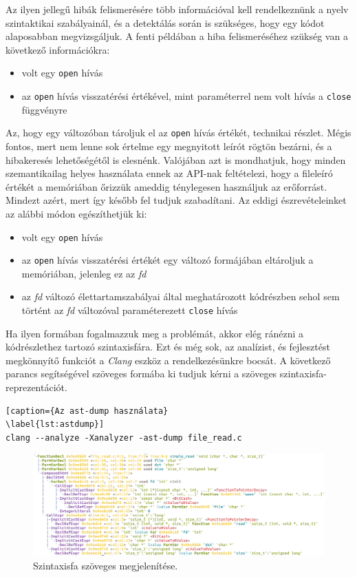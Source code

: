 \documentclass[a4paper,12pt]{report}
\begin{document}
Az ilyen jellegű hibák felismerésére több információval kell rendelkeznünk a nyelv szintaktikai szabályainál, és a detektálás során is szükséges, hogy egy kódot alaposabban megvizsgáljuk. A fenti példában a hiba felismeréséhez szükség van a következő információkra:
\begin{itemize}
\item volt egy \texttt{open} hívás
\item az \texttt{open} hívás visszatérési értékével, mint paraméterrel nem volt hívás a \texttt{close} függvényre
\end{itemize}
Az, hogy egy változóban tároljuk el az \texttt{open} hívás értékét, technikai részlet. Mégis fontos, mert nem lenne sok értelme egy megnyitott leírót rögtön bezárni, és a hibakeresés lehetőségétől is elesnénk.
Valójában azt is mondhatjuk, hogy minden szemantikailag helyes használata ennek az API-nak feltételezi, hogy a fileleíró értékét a memóriában őrizzük ameddig ténylegesen használjuk az erőforrást. Mindezt azért, mert így később fel tudjuk szabadítani. Az eddigi észrevételeinket az alábbi módon egészíthetjük ki:
\begin{itemize}
\item volt egy \texttt{open} hívás
\item az \texttt{open} hívás visszatérési értékét egy változó formájában eltároljuk a memóriában, jelenleg ez az \emph{fd}
\item az \emph{fd} változó élettartamszabályai által meghatározott kódrészben sehol sem történt az \emph{fd} változóval paraméterezett \texttt{close} hívás
\end{itemize}
Ha ilyen formában fogalmazzuk meg a problémát, akkor elég ránézni a kódrészlethez tartozó szintaxisfára. Ezt és még sok, az analízist, és fejlesztést megkönnyítő funkciót a \emph{Clang} eszköz a rendelkezésünkre bocsát. A következő parancs segítségével szöveges formába ki tudjuk kérni a szöveges szintaxisfa-reprezentációt.
\begin{lstlisting}[caption={Az ast-dump használata}
\label{lst:astdump}]
clang --analyze -Xanalyzer -ast-dump file_read.c
\end{lstlisting}

\begin{figure}[h]
\centering
\includegraphics[scale=0.27]{astdumptomorrow.png}
\caption{Szintaxisfa szöveges megjelenítése.}
\end{figure}
\end{document}
